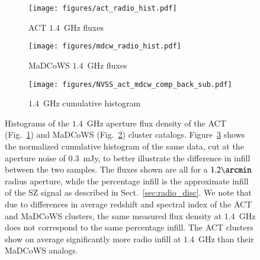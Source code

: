 \documentclass[longauth]{aa} %
\newcommand{\madcows}{MaDCoWS\xspace}
\begin{document}
\begin{figure}
    \centering
    \begin{subfigure}[b]{7.9cm}
         \centering
         \texttt{[image: figures/act\_radio\_hist.pdf]}
         \caption{ACT $1.4$~GHz fluxes}
         \label{fig:ACT_hist}
     \end{subfigure}
     \hfill
     \begin{subfigure}[b]{7.9cm}
         \centering
         \texttt{[image: figures/mdcw\_radio\_hist.pdf]}
         \caption{MaDCoWS $1.4$~GHz fluxes}
         \label{fig:mdcw_hist}
    \end{subfigure}
\hfill
     \begin{subfigure}[b]{7.9cm}
         \centering
         \texttt{[image: figures/NVSS\_act\_mdcw\_comp\_back\_sub.pdf]}
         \caption{$1.4$~GHz cumulative histogram}
         \label{fig:cumul_hist}
     \end{subfigure}

        \caption{Histograms of the $1.4$~GHz aperture flux density of the ACT (Fig.~\ref{fig:ACT_hist}) and MaDCoWS (Fig.~\ref{fig:mdcw_hist}) cluster catalogs. Figure~\ref{fig:cumul_hist} shows the normalized cumulative histogram of the same data, cut at the aperture noise of $0.3$~mJy, to better illustrate the difference in infill between the two samples. The fluxes shown are all for a $1.2\arcmin$ radius aperture, while the percentage infill is the approximate infill of the SZ signal as described in Sect.~\ref{sec:radio_disc}. We note that due to differences in average redshift and spectral index of the ACT and \madcows clusters, the same measured flux density at $1.4$~GHz does not correspond to the same percentage infill. The ACT clusters show on average significantly more radio infill at $1.4$~GHz than their MaDCoWS analogs.
        }
        \label{fig:NVSS_histograms}
\end{figure}
\end{document}
